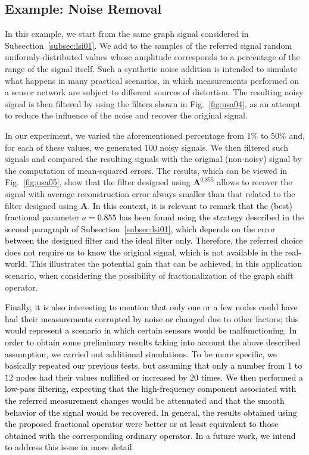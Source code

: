 \subsection{Example: Noise Removal}\label{subsec:lsi02}
In this example, we start from the same graph signal considered in Subsection~\ref{subsec:lsi01}. We add to the samples of the referred signal random uniformly-distributed values whose amplitude corresponds to a percentage of the range of the signal itself. Such a synthetic noise addition is intended to simulate what happens in many practical scenarios, in which measurements performed on a sensor network are subject to different sources of distortion. The resulting noisy signal is then filtered by using the filters shown in Fig.~\ref{fig:usa04}, as an attempt to reduce the influence of the noise and recover the original signal.

In our experiment, we varied the aforementioned percentage from $1\%$ to $50\%$ and, for each of these values, we generated $100$ noisy signals. We then filtered such signals and compared the resulting signals with the original (non-noisy) signal by the computation of mean-squared errors. The results, which can be viewed in Fig.~\ref{fig:usa05}, show that the filter designed using $\mathbf{A}^{0.855}$ allows to recover the signal with average reconstruction error always smaller than that related to the filter designed using $\mathbf{A}$. \textcolor{black}{In this context, it is relevant to remark that the (best) fractional parameter $a=0.855$ has been found using the strategy described in the second paragraph of Subsection~\ref{subsec:lsi01}, which depends on the error between the designed filter and the ideal filter only. Therefore, the referred choice does not require us to know the original signal, which is not available in the real-world.} This illustrates the potential gain that can be achieved, in this application scenario, when considering the possibility of fractionalization of the graph shift operator.

\textcolor{black}{Finally, it is also interesting to mention that only one or a few nodes could have had their measurements corrupted by noise or changed due to other factors; this would represent a scenario in which certain sensors would be malfunctioning. In order to obtain some preliminary results taking into account the above described assumption, we carried out additional simulations. To be more specific, we basically repeated our previous tests, but assuming that only a number from $1$ to $12$ nodes had their values nullified or increased by $20$ times. We then performed a low-pass filtering, expecting that the high-frequency component associated with the referred measurement changes would be attenuated and that the smooth behavior of the signal would be recovered. In general, the results obtained using the proposed fractional operator were better or at least equivalent to those obtained with the corresponding ordinary operator. In a future work, we intend to address this issue in more detail.}


